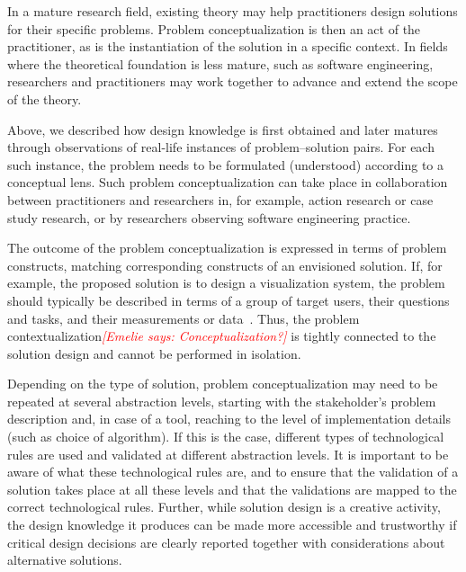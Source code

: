 \documentclass[graybox]{svmult}
\newcommand{\emelie}[1]{\textcolor{red}{{\it [Emelie says: #1]}}}
\newcommand{\emelie}[1]{}
\begin{document}
In a mature research field, existing theory may help practitioners design solutions for their specific problems. Problem conceptualization is then an act of the practitioner, as is the instantiation of the solution in a specific context. In fields where the theoretical foundation is less mature, such as software engineering, researchers and practitioners may work together to advance and extend the scope of the theory. 

 Above, we described how design knowledge is first obtained and later matures through observations of real-life instances of problem--solution pairs. For each such instance, the problem needs to be formulated (understood) according to a conceptual lens. Such problem conceptualization can take place in collaboration between practitioners and researchers in, for example, action research or case study research, or by researchers observing software engineering practice.


The outcome of the problem conceptualization is expressed in terms of problem constructs, matching corresponding constructs of an envisioned solution. If, for example, the proposed solution is to design a visualization system, the problem should typically be described in terms of a group of target users, their questions and tasks, and their measurements or data~\cite{meyer_nested_2015}. Thus, the problem contextualization\emelie{Conceptualization?} is tightly connected to the solution design and cannot be performed in isolation. 



Depending on the type of solution, problem conceptualization may need to be repeated at several abstraction levels, starting with the stakeholder's problem description and, in case of a tool, reaching to the level of implementation details (such as choice of algorithm). If this is the case, different types of technological rules are used and validated at different abstraction levels. It is important to be aware of what these technological rules are, and to ensure that the validation of a solution takes place at all these levels and that the validations are mapped to the correct technological rules. Further, while solution design is a creative activity, the design knowledge it produces can be made more accessible and trustworthy if critical design decisions are clearly reported together with considerations about alternative solutions.
\end{document}
